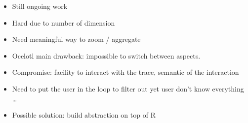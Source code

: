 \begin{itemize}
    \item Still ongoing work
    \item Hard due to number of dimension
    \item Need meaningful way to zoom / aggregate
    \item Ocelotl main drawback: impossible to switch between aspects.
    \item Compromise: facility to interact with the trace, semantic of the interaction
    \item Need to put the user in the loop to filter out yet user don't know everything \ldots
    \item Possible solution: build abstraction on top of R
\end{itemize}

